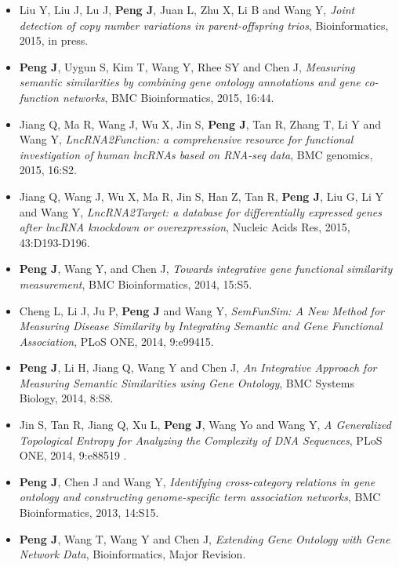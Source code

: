 \documentclass[9.5pt]{article}
\begin{document}
\begin{itemize}
%
	\item Liu Y, Liu J, Lu J, \textbf{Peng J}, Juan L, Zhu X, Li B and Wang Y, \emph{Joint detection of copy number variations in parent-offspring trios}, Bioinformatics, 2015, in press.
	\item \textbf{Peng J}, Uygun S, Kim T, Wang Y, Rhee SY and Chen J, \emph{Measuring semantic similarities by combining gene ontology annotations and gene co-function networks}, BMC Bioinformatics, 2015, 16:44.
%
	\item Jiang Q, Ma R, Wang J, Wu X, Jin S, \textbf{Peng J}, Tan R, Zhang T, Li Y and  Wang Y, \emph{LncRNA2Function: a comprehensive resource for functional investigation of human lncRNAs based on RNA-seq data}, BMC genomics, 2015, 16:S2.
%
	\item Jiang Q, Wang J, Wu X, Ma R, Jin S, Han Z,  Tan R, \textbf{Peng J}, Liu G, Li Y and  Wang Y, \emph{LncRNA2Target: a database for differentially expressed genes after lncRNA knockdown or overexpression}, Nucleic Acids Res, 2015, 43:D193-D196.
%
	\item \textbf{Peng J}, Wang Y, and Chen J, \emph{Towards integrative gene functional similarity measurement}, BMC Bioinformatics, 2014, 15:S5.
%
	\item Cheng L, Li J, Ju P, \textbf{Peng J} and Wang Y, \emph{SemFunSim: A New Method for Measuring Disease Similarity by Integrating Semantic and Gene Functional Association}, PLoS ONE, 2014, 9:e99415.
%
	\item \textbf{Peng J}, Li H, Jiang Q, Wang Y and Chen J, \emph{An Integrative Approach for Measuring Semantic Similarities using Gene Ontology}, BMC Systems Biology, 2014, 8:S8.
%
	\item Jin S, Tan R, Jiang Q, Xu L, \textbf{Peng J}, Wang Yo and Wang Y, \emph{A  Generalized Topological Entropy for Analyzing the Complexity of DNA Sequences}, PLoS ONE, 2014, 9:e88519 .
%
	\item \textbf{Peng J}, Chen J and Wang Y, \emph{Identifying cross-category relations in gene ontology and constructing genome-specific term association networks}, BMC Bioinformatics, 2013, 14:S15.
%
	\item \textbf{Peng J}, Wang T,  Wang Y and Chen J, \emph{Extending Gene Ontology with Gene Network Data}, Bioinformatics, Major Revision.
\end{itemize}
\end{document}
